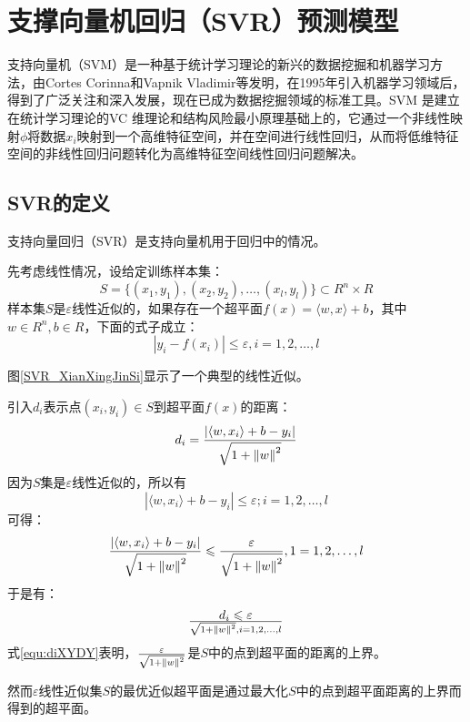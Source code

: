 \section{支撑向量机回归（SVR）预测模型}
支持向量机（SVM）是一种基于统计学习理论的新兴的数据挖掘和机器学习方法，由Cortes Corinna和Vapnik Vladimir等发明，在1995年引入机器学习领域后，得到了广泛关注和深入发展，现在已成为数据挖掘领域的标准工具。SVM 是建立在统计学习理论的VC 维理论和结构风险最小原理基础上的，它通过一个非线性映射$\phi$将数据$x_i$映射到一个高维特征空间，并在空间进行线性回归，从而将低维特征空间的非线性回归问题转化为高维特征空间线性回归问题解决。

\subsection{SVR的定义}
支持向量回归（SVR）是支持向量机用于回归中的情况。

先考虑线性情况，设给定训练样本集：
$$ S = \{ (x_1,y_1),(x_2,y_2),\dots, (x_l,y_l)\} \subset R^n \times R $$
样本集$S$是$\varepsilon$线性近似的，如果存在一个超平面$f(x) = \langle w,x\rangle+b$，其中$w\in R^n, b\in R$，下面的式子成立：
\begin{equation}
\label{equ:yi_fxi}
	\left| y_i -f(x_i) \right| \leqslant \varepsilon, i=1,2,\dots,l
\end{equation}

图\ref{SVR_XianXingJinSi}显示了一个典型的线性近似。

引入$d_i$表示点$(x_i,y_i)\in S$到超平面$f(x)$的距离：
\begin{equation}
	d_i = {\left| \langle w,x_i \rangle +b -y_i \right| 
		 \over 
		\sqrt{ 1+ \left\| w \right\| ^2 }}
\end{equation}
因为$S$集是$\varepsilon$线性近似的，所以有
$$ \left| \langle w,x_i \rangle +b -y_i \right| \leqslant \varepsilon; i = 1,2,\dots,l $$
可得：
$$
{ \left| \langle w,x_i \rangle +b -y_i \right| \over \sqrt{ 1+ \left\| w \right\| ^2 } }   \leqslant  
{ \varepsilon \over \sqrt{ 1+ \left\| w \right\| ^2 } }
,1 = 1,2,\dots,l
$$
于是有：
\begin{equation}
\label{equ:diXYDY}
	d_i \leqslant \varepsilon
	\over 
	\sqrt{ 1+ \left\| w \right\| ^2 } ,i=1,2,\dots,l
\end{equation}
式\ref{equ:diXYDY}表明，${\varepsilon \over \sqrt{ 1+ \left\| w \right\| ^2 }}$是$S$中的点到超平面的距离的上界。

然而$\varepsilon$线性近似集$S$的最优近似超平面是通过最大化$S$中的点到超平面距离的上界而得到的超平面。

